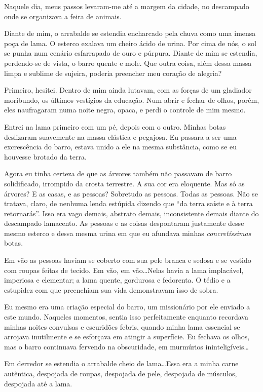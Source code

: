 Naquele dia, meus passos levaram-me até a margem da cidade, no descampado onde se organizava a feira de animais.

Diante de mim, o arrabalde se estendia encharcado pela chuva como uma imensa poça de lama. O esterco exalava um cheiro ácido de urina. Por cima de nós, o sol se punha num cenário esfarrapado de ouro e púrpura. Diante de mim se estendia, perdendo-se de vista, o barro quente e mole. Que outra coisa, além dessa massa limpa e sublime de sujeira, poderia preencher meu coração de alegria?

Primeiro, hesitei. Dentro de mim ainda lutavam, com as forças de um gladiador moribundo, os últimos vestígios da educação. Num abrir e fechar de olhos, porém, eles naufragaram numa noite negra, opaca, e perdi o controle de mim mesmo.

Entrei na lama primeiro com um pé, depois com o outro. Minhas botas deslizaram suavemente na massa elástica e pegajosa. Eu passara a ser uma excrescência do barro, estava unido a ele na mesma substância, como se eu houvesse brotado da terra.

Agora eu tinha certeza de que as árvores também não passavam de barro solidificado, irrompido da crosta terrestre. A sua cor era eloquente. Mas só as árvores? E as casas, e as pessoas? Sobretudo as pessoas. Todas as pessoas. Não se tratava, claro, de nenhuma lenda estúpida dizendo que ``da terra saíste e à terra retornarás''. Isso era vago demais, abstrato demais, inconsistente demais diante do descampado lamacento. As pessoas e as coisas despontaram justamente desse mesmo esterco e dessa mesma urina em que eu afundava minhas \textit{concretíssimas} botas.

Em vão as pessoas haviam se coberto com sua pele branca e sedosa e se vestido com roupas feitas de tecido. Em vão, em vão\dots Nelas havia a lama implacável, imperiosa e elementar; a lama quente, gordurosa e fedorenta. O tédio e a estupidez com que preenchiam sua vida demonstravam isso de sobra.

Eu mesmo era uma criação especial do barro, um missionário por ele enviado a este mundo. Naqueles momentos, sentia isso perfeitamente enquanto recordava minhas noites convulsas e escuridões febris, quando minha lama essencial se arrojava inutilmente e se esforçava em atingir a superfície. Eu fechava os olhos, mas o barro continuava fervendo na obscuridade, em murmúrios ininteligíveis\dots

Em derredor se estendia o arrabalde cheio de lama\dots Essa era a minha carne autêntica, despojada de roupas, despojada de pele, despojada de músculos, despojada até a lama.

